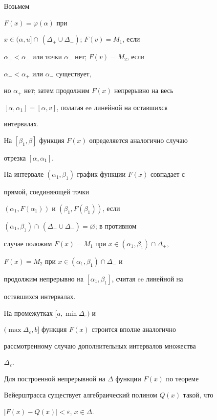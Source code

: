Возьмем


$F(x)=\varphi(\alpha)$ при


$x\in(\alpha,u]\cap\,(\Delta_+\cup\Delta_-)$; $F(v)=M_1$, если


$\alpha_+<\alpha_-$ или точки $\alpha_-$ нет; $F(v)=M_2$, если


$\alpha_-<\alpha_+$ или $\alpha_-$ существует,


но $\alpha_+$ нет; затем продолжим $F(x)$ непрерывно на весь


$[\alpha,\alpha_1]=[\alpha,v]$, полагая ee линейной на оставшихся


интервалах.





На $[\beta_1,\beta]$ функция $F(x)$ определяется аналогично случаю


отрезка $[\alpha,\alpha_1]$.





На интервале $(\alpha_1,\beta_1)$ график функции $F(x)$ совпадает с


прямой, соединяющей точки\linebreak


$(\alpha_1,F(\alpha_1))$ и $(\beta_1,F(\beta_1))$, если


$(\alpha_1,\beta_1)\cap\,(\Delta_+\cup\Delta_-)=\varnothing$; в противном


случае положим $F(x)=M_1$ при $x\in(\alpha_1,\beta_1)\cap\Delta_+$,


$F(x)=M_2$ при $x\in(\alpha_1,\beta_1)\cap\Delta_-$ и


продолжим непрерывно на $[\alpha_1,\beta_1]$, считая ee линейной на


оставшихся интервалах.





На промежутках $[a,\min\Delta_\varepsilon)$ и


$(\max\Delta_\varepsilon,b]$ функция $F(x)$ строится вполне аналогично


рассмотренному случаю дополнительных интервалов множества


$\Delta_\varepsilon$.





Для построенной непрерывной на $\Delta$ функции $F(x)$ по теореме


Вейерштрасса существует алгебраический полином $Q(x)$ такой, что


$|F(x)-Q(x)|<\varepsilon$, $x\in\Delta$.





